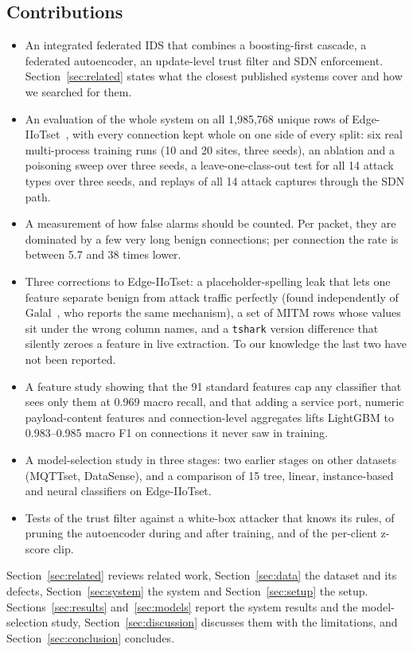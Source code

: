 \subsection*{Contributions}
\begin{itemize}
  \item An integrated federated IDS that combines a boosting-first cascade, a federated autoencoder, an update-level trust filter and SDN enforcement. Section~\ref{sec:related} states what the closest published systems cover and how we searched for them.
  \item An evaluation of the whole system on all 1,985,768 unique rows of Edge-IIoTset~\cite{ferrag2022}, with every connection kept whole on one side of every split: six real multi-process training runs (10 and 20 sites, three seeds), an ablation and a poisoning sweep over three seeds, a leave-one-class-out test for all 14 attack types over three seeds, and replays of all 14 attack captures through the SDN path.
  \item A measurement of how false alarms should be counted. Per packet, they are dominated by a few very long benign connections; per connection the rate is between 5.7 and 38 times lower.
  \item Three corrections to Edge-IIoTset: a placeholder-spelling leak that lets one feature separate benign from attack traffic perfectly (found independently of Galal~\cite{galal2026}, who reports the same mechanism), a set of MITM rows whose values sit under the wrong column names, and a \texttt{tshark} version difference that silently zeroes a feature in live extraction. To our knowledge the last two have not been reported.
  \item A feature study showing that the 91 standard features cap any classifier that sees only them at 0.969 macro recall, and that adding a service port, numeric payload-content features and connection-level aggregates lifts LightGBM to 0.983--0.985 macro F1 on connections it never saw in training.
  \item A model-selection study in three stages: two earlier stages on other datasets (MQTTset, DataSense), and a comparison of 15 tree, linear, instance-based and neural classifiers on Edge-IIoTset.
  \item Tests of the trust filter against a white-box attacker that knows its rules, of pruning the autoencoder during and after training, and of the per-client z-score clip.
\end{itemize}

Section~\ref{sec:related} reviews related work, Section~\ref{sec:data} the dataset and its defects, Section~\ref{sec:system} the system and Section~\ref{sec:setup} the setup. Sections~\ref{sec:results} and~\ref{sec:models} report the system results and the model-selection study, Section~\ref{sec:discussion} discusses them with the limitations, and Section~\ref{sec:conclusion} concludes.

